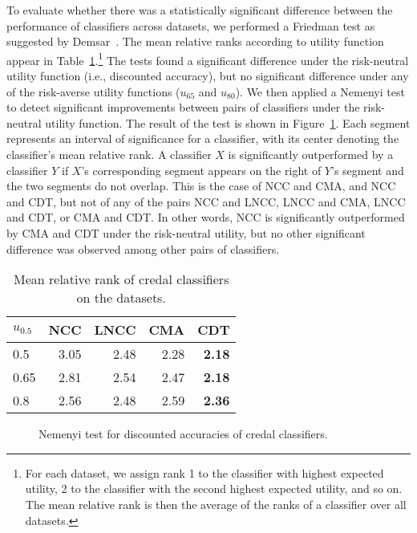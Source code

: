 \documentclass[a4paper,10pt,reqno]{amsart}
\theoremstyle{remark}
\begin{document}
To evaluate whether there was a statistically significant difference between the performance of classifiers across datasets, we performed a Friedman test %
as suggested by Demsar~\cite{demsar06jmlr}. The mean relative ranks according to utility function appear in Table~\ref{tab:ranks}.\footnote{For each dataset, we assign rank 1 to the classifier with highest expected utility, 2 to the classifier with the second highest expected utility, and so on. The mean relative rank is then the average of the ranks of a classifier over all datasets.} The tests found a significant difference under the risk-neutral utility function (i.e., discounted accuracy), but no significant difference under any of the risk-averse utility functions ($u_{65}$ and $u_{80}$). We then applied a Nemenyi test to detect significant improvements between pairs of classifiers under the risk-neutral utility function. The result of the test is shown in Figure~\ref{fig:dacc-ranks}. Each segment represents an interval of significance for a classifier, with its center denoting the classifier's mean relative rank. A classifier $X$ is significantly outperformed by a classifier $Y$ if $X$'s corresponding segment appears on the right of $Y$'s segment and the two segments do not overlap. This is the case of NCC and CMA, and NCC and CDT, but not of any of the pairs NCC and LNCC, LNCC and CMA, LNCC and CDT, or CMA and CDT. In other words, NCC is significantly outperformed by CMA and CDT under the risk-neutral utility, but no other significant difference was observed among other pairs of classifiers.

\begin{table}[htp]
  \centering
  \begin{tabular}{lrrrr}
    \toprule
      $u_{0.5}$ &  NCC & LNCC & CMA & CDT\\ \midrule
    0.5 & 3.05 & 2.48 & 2.28 & \textbf{2.18}\\
    0.65 & 2.81 & 2.54 & 2.47 & \textbf{2.18} \\
    0.8 & 2.56 & 2.48 & 2.59 & \textbf{2.36} \\ \bottomrule
  \end{tabular}
  \caption{Mean relative rank of credal classifiers on the datasets.}
  \label{tab:ranks}
\end{table}

\begin{figure}[htp]
  \centering
  \caption{Nemenyi test for discounted accuracies of credal classifiers.}
  \label{fig:dacc-ranks}
\end{figure}
\end{document}
